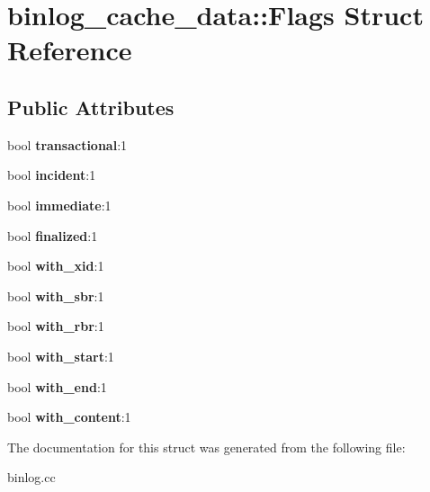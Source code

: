 \hypertarget{structbinlog__cache__data_1_1Flags}{}\section{binlog\+\_\+cache\+\_\+data\+:\+:Flags Struct Reference}
\label{structbinlog__cache__data_1_1Flags}
\subsection*{Public Attributes}
\begin{DoxyCompactItemize}
\item 
\mbox{\label{structbinlog__cache__data_1_1Flags_aea1362ff5efb691c2965746c99fdcd86}} 
bool {\bfseries transactional}\+:1
\item 
\mbox{\label{structbinlog__cache__data_1_1Flags_ab5a7ec70503a7ea2d9a531d888b3acdd}} 
bool {\bfseries incident}\+:1
\item 
\mbox{\label{structbinlog__cache__data_1_1Flags_afab8ce06b22e1a5a2fe06ec9bc76c1da}} 
bool {\bfseries immediate}\+:1
\item 
\mbox{\label{structbinlog__cache__data_1_1Flags_a889290dec38d2541b590b8fb63fc9da0}} 
bool {\bfseries finalized}\+:1
\item 
\mbox{\label{structbinlog__cache__data_1_1Flags_a016a546e32719da59e2d06614d54c26e}} 
bool {\bfseries with\+\_\+xid}\+:1
\item 
\mbox{\label{structbinlog__cache__data_1_1Flags_aad85654209d56ce17fa8c177b5b721a8}} 
bool {\bfseries with\+\_\+sbr}\+:1
\item 
\mbox{\label{structbinlog__cache__data_1_1Flags_a04f2f00f63da88b5a26c2f6921c3552d}} 
bool {\bfseries with\+\_\+rbr}\+:1
\item 
\mbox{\label{structbinlog__cache__data_1_1Flags_a1a31e8b88abb63d0d807a08e65de7149}} 
bool {\bfseries with\+\_\+start}\+:1
\item 
\mbox{\label{structbinlog__cache__data_1_1Flags_a932e97eba6049a503d4a0be1171520ab}} 
bool {\bfseries with\+\_\+end}\+:1
\item 
\mbox{\label{structbinlog__cache__data_1_1Flags_aad0d4e3e37fcc40515e51ddeffec7adb}} 
bool {\bfseries with\+\_\+content}\+:1
\end{DoxyCompactItemize}


The documentation for this struct was generated from the following file\+:\begin{DoxyCompactItemize}
\item 
binlog.\+cc\end{DoxyCompactItemize}

